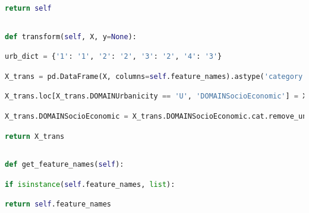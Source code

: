 \documentclass[
  11pt,
  a4paper,
  DIV=12,captions=tableheading,oneside]{scrbook}
\begin{document}
\begin{lstlisting}[language=Python,stepnumber=2,basicstyle=\footnotesize]
        return self\end{lstlisting}
\begin{lstlisting}[language=Python,stepnumber=2,basicstyle=\footnotesize]
\end{lstlisting}
\begin{lstlisting}[language=Python,stepnumber=2,basicstyle=\footnotesize]
    def transform(self, X, y=None):\end{lstlisting}
\begin{lstlisting}[language=Python,stepnumber=2,basicstyle=\footnotesize]
        urb_dict = {'1': '1', '2': '2', '3': '2', '4': '3'}\end{lstlisting}
\begin{lstlisting}[language=Python,stepnumber=2,basicstyle=\footnotesize]
        X_trans = pd.DataFrame(X, columns=self.feature_names).astype('category')\end{lstlisting}
\begin{lstlisting}[language=Python,stepnumber=2,basicstyle=\footnotesize]
        X_trans.loc[X_trans.DOMAINUrbanicity == 'U', 'DOMAINSocioEconomic'] = X_trans.loc[X_trans.DOMAINUrbanicity == 'U', 'DOMAINSocioEconomic'].map(urb_dict)\end{lstlisting}
\begin{lstlisting}[language=Python,stepnumber=2,basicstyle=\footnotesize]
        X_trans.DOMAINSocioEconomic = X_trans.DOMAINSocioEconomic.cat.remove_unused_categories()\end{lstlisting}
\begin{lstlisting}[language=Python,stepnumber=2,basicstyle=\footnotesize]
        return X_trans\end{lstlisting}
\begin{lstlisting}[language=Python,stepnumber=2,basicstyle=\footnotesize]
\end{lstlisting}
\begin{lstlisting}[language=Python,stepnumber=2,basicstyle=\footnotesize]
    def get_feature_names(self):\end{lstlisting}
\begin{lstlisting}[language=Python,stepnumber=2,basicstyle=\footnotesize]
        if isinstance(self.feature_names, list):\end{lstlisting}
\begin{lstlisting}[language=Python,stepnumber=2,basicstyle=\footnotesize]
            return self.feature_names\end{lstlisting}
\end{document}
